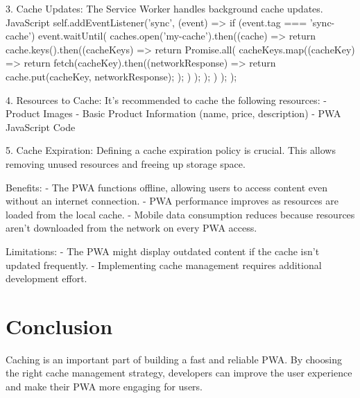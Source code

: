 \documentclass{report}
\begin{document}
3. Cache Updates: The Service Worker handles background cache updates.
JavaScript
self.addEventListener('sync', (event) => {
  if (event.tag === 'sync-cache') {
    event.waitUntil(
      caches.open('my-cache').then((cache) => {
        return cache.keys().then((cacheKeys) => {
          return Promise.all(
            cacheKeys.map((cacheKey) => {
              return fetch(cacheKey).then((networkResponse) => {
                return cache.put(cacheKey, networkResponse);
              });
            })
          );
        });
      })
    );
  }
});

4. Resources to Cache: It's recommended to cache the following resources:
- Product Images
- Basic Product Information (name, price, description)
- PWA JavaScript Code

5. Cache Expiration: Defining a cache expiration policy is crucial. This allows removing unused resources and freeing up storage space.

Benefits:
- The PWA functions offline, allowing users to access content even without an internet connection.
- PWA performance improves as resources are loaded from the local cache.
- Mobile data consumption reduces because resources aren't downloaded from the network on every PWA access.

Limitations:
- The PWA might display outdated content if the cache isn't updated frequently.
- Implementing cache management requires additional development effort.


\section{Conclusion}\label{Conclusion}
Caching is an important part of building a fast and reliable PWA. By choosing the right cache management strategy, developers can improve the user experience and make their PWA more engaging for users.



%

\end{document}
